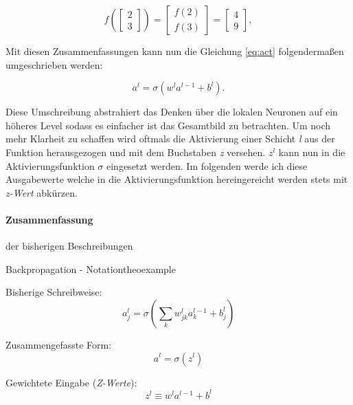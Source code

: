 \begin{equation}
  f\left(\left[ \begin{array}{c} 2 \\ 3 \end{array} \right] \right)
  = \left[ \begin{array}{c} f(2) \\ f(3) \end{array} \right]
  = \left[ \begin{array}{c} 4 \\ 9 \end{array} \right],
\end{equation}

Mit diesen Zusammenfassungen kann nun die Gleichung \ref{eq:act} folgendermaßen umgeschrieben werden: 

\begin{equation}
  a^{l} = \sigma(w^l a^{l-1}+b^l).
\end{equation}

Diese Umschreibung abstrahiert das Denken über die lokalen Neuronen auf ein höheres Level sodass es einfacher ist das Gesamtbild zu betrachten. Um noch mehr Klarheit zu schaffen wird oftmals die Aktivierung einer Schicht \emph{l} aus der Funktion herausgezogen und mit dem Buchstaben \emph{z} versehen. $z^l$ kann nun in die Aktivierungsfunktion $\sigma$ eingesetzt werden. Im folgenden werde ich diese Ausgabewerte welche in die Aktivierungsfunktion hereingereicht werden stets mit \emph{z-Wert} abkürzen. 

\paragraph{Zusammenfassung} der bisherigen Beschreibungen

\begin{mytheo}{Backpropagation - Notation}{theoexample}

Bisherige Schreibweise:
\begin{equation}
  a^{l}_j = \sigma\left( \sum_k w^{l}_{jk} a^{l-1}_k + b^l_j \right) \nonumber
\end{equation}

Zusammengefasste Form:
\begin{equation} \label{eq:zusForm}
a^l = \sigma(z^l)
\end{equation}

Gewichtete Eingabe (\emph{Z-Werte}):
\begin{equation} \label{eq:gewEin}
  z^l \equiv w^l a^{l-1}+b^l
\end{equation}

\end{mytheo}

